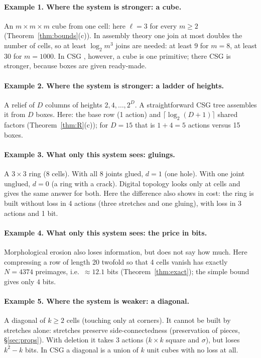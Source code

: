 \documentclass[11pt,a4paper]{article}
\theoremstyle{plain}
\theoremstyle{definition}
\theoremstyle{remark}
\begin{document}
\paragraph{Example 1. Where the system is stronger: a cube.} An $m\times m\times m$ cube from one cell: here $\ell=3$ for every $m\ge2$ (Theorem~\ref{thm:bounds}(c)). In assembly theory \cite{assembly} one join at most doubles the number of cells, so at least $\log_2 m^3$ joins are needed: at least $9$ for $m=8$, at least $30$ for $m=1000$. In CSG \cite{requicha}, however, a cube is one primitive; there CSG is stronger, because boxes are given ready-made.

\paragraph{Example 2. Where the system is stronger: a ladder of heights.} A relief of $D$ columns of heights $2,4,\dots,2^D$. A straightforward CSG tree assembles it from $D$ boxes. Here: the base row (1 action) and $\lceil\log_2(D+1)\rceil$ shared factors (Theorem~\ref{thm:R}(c)); for $D=15$ that is $1+4=5$ actions versus 15 boxes.

\paragraph{Example 3. What only this system sees: gluings.} A $3\times3$ ring (8 cells). With all 8 joints glued, $d=1$ (one hole). With one joint unglued, $d=0$ (a ring with a crack). Digital topology \cite{kong} looks only at cells and gives the same answer for both. Here the difference also shows in cost: the ring is built without loss in 4 actions (three stretches and one gluing), with loss in 3 actions and 1 bit.

\paragraph{Example 4. What only this system sees: the price in bits.} Morphological erosion also loses information, but does not say how much. Here compressing a row of length 20 twofold so that 4 cells vanish has exactly $N=4374$ preimages, i.e.\ $\approx12.1$ bits (Theorem~\ref{thm:exact}); the simple bound gives only $4$ bits.

\paragraph{Example 5. Where the system is weaker: a diagonal.} A diagonal of $k\ge2$ cells (touching only at corners). It cannot be built by stretches alone: stretches preserve side-connectedness (preservation of pieces, §\ref{sec:props}). With deletion it takes 3 actions ($k\times k$ square and $\sigma$), but loses $k^2-k$ bits. In CSG a diagonal is a union of $k$ unit cubes with no loss at all.
\end{document}

